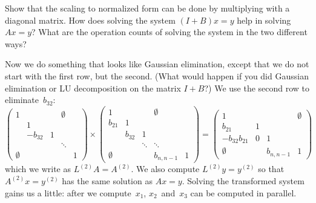 \begin{exercise}
  Show that the scaling to normalized form can be done by multiplying
  with a diagonal matrix. 
  How does solving the system $(I+B)x=y$ help in solving $Ax=y$? What
  are the operation counts of solving the system in the two different ways?
\end{exercise}

Now we do something that looks like Gaussian elimination, except that
we do not start with the first row, but the second. (What would happen
if you did Gaussian elimination or LU decomposition on the matrix
$I+B$?) We use the second row to eliminate~$b_{32}$:
\[
  \begin{pmatrix}
    1&&&\emptyset\\ &1\\ &-b_{32}&1\\ &&&\ddots\\
    \emptyset&&&&1
  \end{pmatrix}\times
  \begin{pmatrix}
    1&&&\emptyset\\ b_{21}&1\\ &b_{32}&1\\ &&\ddots&\ddots\\ 
    \emptyset&&&b_{n,n-1}&1
  \end{pmatrix}
  =
  \begin{pmatrix}
    1&&&\emptyset\\ b_{21}&1\\ -b_{32}b_{21}&0&1\\ 
    \emptyset&&b_{n,n-1}&1
  \end{pmatrix}
\]
which we write as $L^{(2)}A=A^{(2)}$. We also compute
$L^{(2)}y=y^{(2)}$ so that $A^{(2)}x=y^{(2)}$ has the same solution as
$Ax=y$. Solving the transformed system gains us a little: after we
compute~$x_1$, $x_2$~and~$x_3$ can be computed in parallel.

